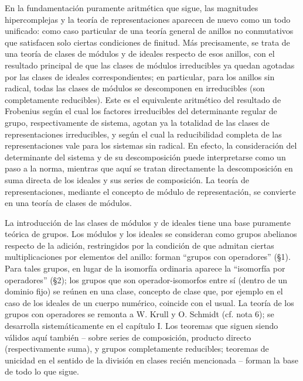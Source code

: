 \documentclass[11pt]{article}
\begin{document}
En la fundamentación puramente aritmética que sigue, las magnitudes hipercomplejas y la teoría de representaciones aparecen de nuevo como un todo unificado: como caso particular de una teoría general de anillos no conmutativos que satisfacen solo ciertas condiciones de finitud. Más precisamente, se trata de una teoría de clases de módulos y de ideales respecto de esos anillos, con el resultado principal de que las clases de módulos irreducibles ya quedan agotadas por las clases de ideales correspondientes; en particular, para los anillos sin radical, todas las clases de módulos se descomponen en irreducibles (son completamente reducibles). Este es el equivalente aritmético del resultado de Frobenius según el cual los factores irreducibles del determinante regular de grupo, respectivamente de sistema, agotan ya la totalidad de las clases de representaciones irreducibles, y según el cual la reducibilidad completa de las representaciones vale para los sistemas sin radical. En efecto, la consideración del determinante del sistema y de su descomposición puede interpretarse como un paso a la norma, mientras que aquí se tratan directamente la descomposición en suma directa de los ideales y sus series de composición. La teoría de representaciones, mediante el concepto de módulo de representación, se convierte en una teoría de clases de módulos.

La introducción de las clases de módulos y de ideales tiene una base puramente teórica de grupos. Los módulos y los ideales se consideran como grupos abelianos respecto de la adición, restringidos por la condición de que admitan ciertas multiplicaciones por elementos del anillo: forman ``grupos con operadores'' (§1). Para tales grupos, en lugar de la isomorfía ordinaria aparece la ``isomorfía por operadores'' (§2); los grupos que son operador-isomorfos entre sí (dentro de un dominio fijo) se reúnen en una clase, concepto de clase que, por ejemplo en el caso de los ideales de un cuerpo numérico, coincide con el usual. La teoría de los grupos con operadores se remonta a W. Krull y O. Schmidt (cf. nota 6); se desarrolla sistemáticamente en el capítulo I. Los teoremas que siguen siendo válidos aquí también -- sobre series de composición, producto directo (respectivamente suma), y grupos completamente reducibles; teoremas de unicidad en el sentido de la división en clases recién mencionada -- forman la base de todo lo que sigue.
\end{document}
